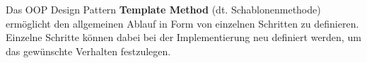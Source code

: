 Das OOP Design Pattern \textbf{Template Method} (dt. Schablonenmethode) ermöglicht den allgemeinen Ablauf in Form von einzelnen Schritten zu definieren.
Einzelne Schritte können dabei bei der Implementierung neu definiert werden, um das gewünschte Verhalten festzulegen.
